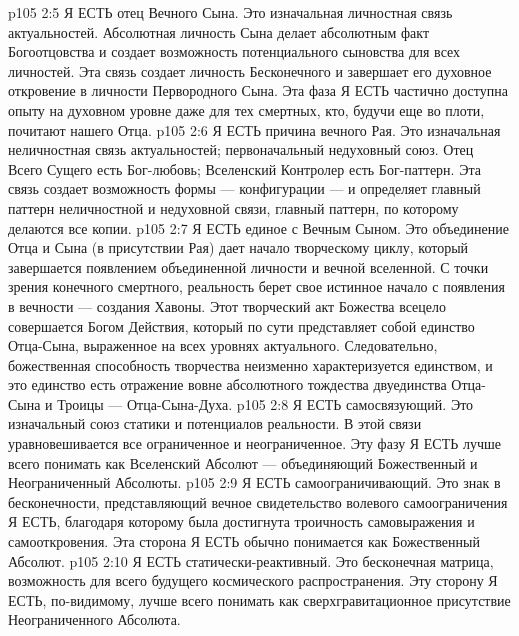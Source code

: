 \vs p105 2:5 \bibnobreakspace {} Я ЕСТЬ отец Вечного Сына. Это изначальная личностная связь актуальностей. Абсолютная личность Сына делает абсолютным факт Богоотцовства и создает возможность потенциального сыновства для всех личностей. Эта связь создает личность Бесконечного и завершает его духовное откровение в личности Первородного Сына. Эта фаза Я ЕСТЬ частично доступна опыту на духовном уровне даже для тех смертных, кто, будучи еще во плоти, почитают нашего Отца.
\vs p105 2:6 \bibnobreakspace {}  Я ЕСТЬ причина вечного Рая. Это изначальная неличностная связь актуальностей; первоначальный недуховный союз. Отец Всего Сущего есть Бог\hyp{}любовь; Вселенский Контролер есть Бог\hyp{}паттерн. Эта связь создает возможность формы --- конфигурации --- и определяет главный паттерн неличностной и недуховной связи, главный паттерн, по которому делаются все копии.
\vs p105 2:7 \bibnobreakspace {} Я ЕСТЬ единое с Вечным Сыном. Это объединение Отца и Сына (в присутствии Рая) дает начало творческому циклу, который завершается появлением объединенной личности и вечной вселенной. С точки зрения конечного смертного, реальность берет свое истинное начало с появления в вечности --- создания Хавоны. Этот творческий акт Божества всецело совершается Богом Действия, который по сути представляет собой единство Отца\hyp{}Сына, выраженное на всех уровнях актуального. Следовательно, божественная способность творчества неизменно характеризуется единством, и это единство есть отражение вовне абсолютного тождества двуединства Отца\hyp{}Сына и Троицы --- Отца\hyp{}Сына\hyp{}Духа.
\vs p105 2:8 \bibnobreakspace {} Я ЕСТЬ самосвязующий. Это изначальный союз статики и потенциалов реальности. В этой связи уравновешивается все ограниченное и неограниченное. Эту фазу Я ЕСТЬ лучше всего понимать как Вселенский Абсолют --- объединяющий Божественный и Неограниченный Абсолюты.
\vs p105 2:9 \bibnobreakspace {} Я ЕСТЬ самоограничивающий. Это знак в бесконечности, представляющий вечное свидетельство волевого самоограничения Я ЕСТЬ, благодаря которому была достигнута троичность самовыражения и самооткровения. Эта сторона Я ЕСТЬ обычно понимается как Божественный Абсолют.
\vs p105 2:10 \bibnobreakspace {} Я ЕСТЬ статически\hyp{}реактивный. Это бесконечная матрица, возможность для всего будущего космического распространения. Эту сторону Я ЕСТЬ, по\hyp{}видимому, лучше всего понимать как сверхгравитационное присутствие Неограниченного Абсолюта.
